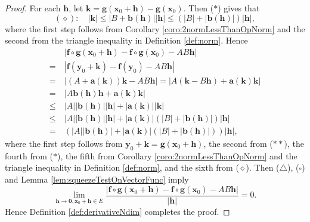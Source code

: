 \begin{proof}
  For each $\mathbf{h}$,
  let $\mathbf{k}=\mathbf{g}(\mathbf{x}_{0}+\mathbf{h})
  -\mathbf{g}(\mathbf{x}_{0})$.
  Then ($*$) gives that
  \begin{displaymath}
    (\diamond):\quad
    |\mathbf{k}|\le |B+\mathbf{b}(\mathbf{h})||\mathbf{h}|
    \le (|B|+|\mathbf{b}(\mathbf{h})|)|\mathbf{h}|,
  \end{displaymath}
  where the first step follows from
  Corollary \ref{coro:2normLessThanOpNorm} and the second from
  the triangle inequality in Definition \ref{def:norm}.
  Hence
  \begin{align*}
    &\ |\mathbf{f}\circ \mathbf{g}(\mathbf{x}_{0}+\mathbf{h})
      -\mathbf{f}\circ \mathbf{g}(\mathbf{x}_{0})-AB\mathbf{h}|\\
    =
    &\ |\mathbf{f}(\mathbf{y}_{0}+\mathbf{k})-
      \mathbf{f}(\mathbf{y}_{0})-AB\mathbf{h}| \\
    =
    &\ |(A+\mathbf{a}(\mathbf{k}))\mathbf{k}-AB\mathbf{h}|
      = |A(\mathbf{k}-B\mathbf{h})+\mathbf{a}(\mathbf{k})\mathbf{k}|\\
    =
    &\ |A\mathbf{b}(\mathbf{h})\mathbf{h}
      +\mathbf{a}(\mathbf{k})\mathbf{k}|\\
    \le
    &\ |A||\mathbf{b}(\mathbf{h})||\mathbf{h}|
      +|\mathbf{a}(\mathbf{k})||\mathbf{k}|\\
    \le
    &\ |A||\mathbf{b}(\mathbf{h})||\mathbf{h}|
      +|\mathbf{a}(\mathbf{k})|(|B|+|\mathbf{b}(\mathbf{h})|)|\mathbf{h}|
    \\ =
    &\ (|A||\mathbf{b}(\mathbf{h})|+|\mathbf{a}(\mathbf{k})|
       (|B|+|\mathbf{b}(\mathbf{h})|))|\mathbf{h}|,
  \end{align*}
  where the first step follows from
  $\mathbf{y}_{0}+\mathbf{k}=\mathbf{g}(\mathbf{x}_{0}+\mathbf{h})$,
  the second from ($**$), the fourth from ($*$), the fifth from
  Corollary \ref{coro:2normLessThanOpNorm} and
  the triangle inequality in Definition \ref{def:norm},
  and the sixth from
  ($\diamond$). Then ($\triangle$), ($\square$) and
  Lemma \ref{lem:squeezeTestOnVectorFunc} imply
  \begin{displaymath}
    \lim_{\mathbf{h}\rightarrow \mathbf{0},\mathbf{x}_{0}+\mathbf{h}\in E}
    \frac{|\mathbf{f}\circ \mathbf{g}(\mathbf{x}_{0}+\mathbf{h})
      -\mathbf{f}\circ \mathbf{g}
      (\mathbf{x}_{0})-AB\mathbf{h}|}{|\mathbf{h}|}=0.
  \end{displaymath}
  Hence Definition \ref{def:derivativeNdim} completes the proof.
\end{proof}


